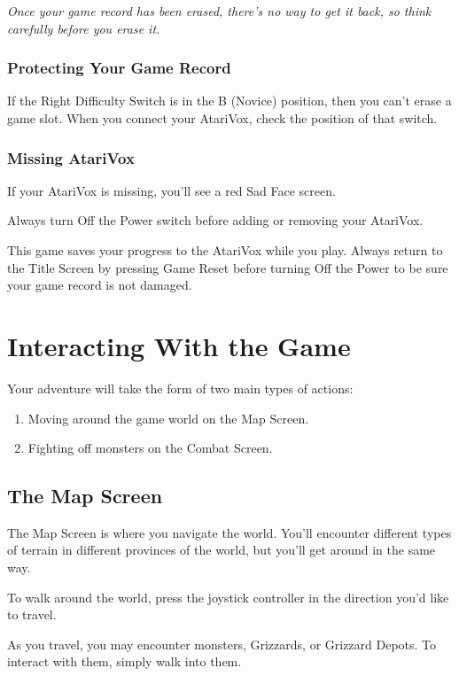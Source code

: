 \documentclass[12pt,twoside,openright,book]{memoir}
\begin{document}
\emph{Once your  game record has been  erased, there's no way  to get it
  back, so think carefully before you erase it.}

\subsection{Protecting Your Game Record}

If the Right  Difficulty Switch is in the B  (Novice) position, then you
can't  erase a  game slot.  When you  connect your  AtariVox, check  the
position of that switch.

\subsection{Missing AtariVox}

If your AtariVox is missing, you'll see a red Sad Face screen.

Always   turn  Off   the  Power   switch  before   adding  or   removing
your AtariVox.

This  game  saves  your  progress   to  the  AtariVox  while  you  play.
Always return to the Title Screen  by pressing Game Reset before turning
Off the Power to be sure your game record is not damaged.

\chapter{Interacting With the Game}

Your adventure will take the form of two main types of actions:

\begin{enumerate}
\item Moving around the game world on the Map Screen.
\item Fighting off monsters on the Combat Screen.
\end{enumerate}

\section{The Map Screen}

The Map Screen is where you navigate the world.  You'll encounter different
types of terrain in different provinces of the world, but you'll get around
in the same way.

To walk around the world, press the joystick controller in the direction
you'd like to travel.

As you travel, you may encounter monsters, Grizzards, or Grizzard Depots. To
interact with them, simply walk into them.
\end{document}
